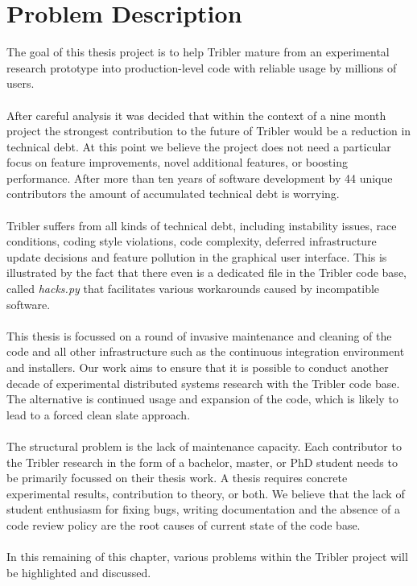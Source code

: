 \chapter{Problem Description}
\label{chapter:problem-description}
The goal of this thesis project is to help Tribler mature from an experimental research prototype into production-level code with reliable usage by millions of users.\\\\
After careful analysis it was decided that within the context of a nine month project the strongest contribution to the future of Tribler would be a reduction in technical debt. At this point we believe the project does not need a particular focus on feature improvements, novel additional features, or boosting performance. After more than ten years of software development by 44 unique contributors the amount of accumulated technical debt is worrying.\\\\
Tribler suffers from all kinds of technical debt, including instability issues, race conditions, coding style violations, code complexity, deferred infrastructure update decisions and feature pollution in the graphical user interface. This is illustrated by the fact that there even is a dedicated file in the Tribler code base, called \emph{hacks.py} that facilitates various workarounds caused by incompatible software.\\\\
This thesis is focussed on a round of invasive maintenance and cleaning of the code and all other infrastructure such as the continuous integration environment and installers. Our work aims to ensure that it is possible to conduct another decade of experimental distributed systems research with the Tribler code base. The alternative is continued usage and expansion of the code, which is likely to lead to a forced clean slate approach.\\\\
The structural problem is the lack of maintenance capacity. Each contributor to the Tribler research in the form of a bachelor, master, or PhD student needs to be primarily focussed on their thesis work. A thesis requires concrete experimental results, contribution to theory, or both. We believe that the lack of student enthusiasm for fixing bugs, writing documentation and the absence of a code review policy are the root causes of current state of the code base.\\\\
In this remaining of this chapter, various problems within the Tribler project will be highlighted and discussed.


